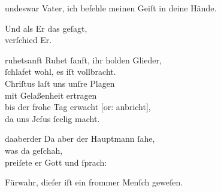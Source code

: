 \documentclass[tocstyle=ref-genre]{ees}
\begin{document}
{\begin{movement}{undeswar}
  \voice[Jesus]
  Vater, ich befehle meinen Geiſt in deine Hände.

  \voice[Evangelist]
  Und als Er das geſagt,\\
  verſchied Er.
\end{movement}

\begin{movement}{ruhetsanft}
  Ruhet ſanft, ihr holden Glieder,\\
  ſchlafet wohl, es iſt vollbracht.\\
  Chriſtus laſt uns unſre Plagen\\
  mit Gelaßenheit ertragen\\
  bis der frohe Tag erwacht [or: anbricht],\\
  da uns Jeſus ſeelig macht.
\end{movement}

\begin{movement}{daaberder}
  \voice[Evangelist]
  Da aber der Hauptmann ſahe,\\
  was da geſchah,\\
  preiſete er Gott und ſprach:

  \voice[Hauptmann]
  Fürwahr, dieſer iſt ein frommer Menſch geweſen.


\end{movement}}
\end{document}
